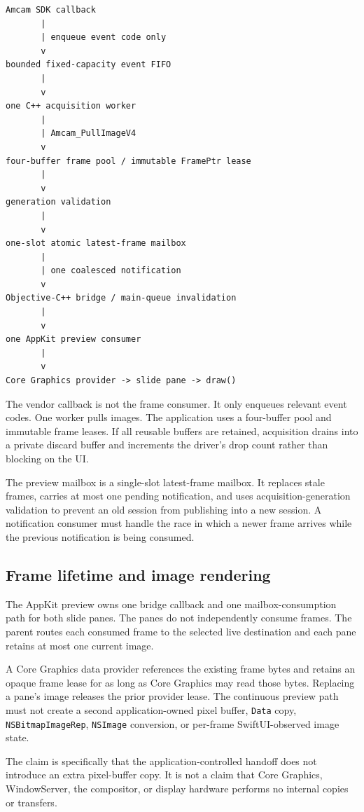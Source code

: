 \documentclass[11pt,a4paper,oneside]{article}
\newcommand{\code}[1]{\texttt{\small #1}}
\begin{document}
\begin{lstlisting}[basicstyle=\ttfamily\small,frame=single]
Amcam SDK callback
       |
       | enqueue event code only
       v
bounded fixed-capacity event FIFO
       |
       v
one C++ acquisition worker
       |
       | Amcam_PullImageV4
       v
four-buffer frame pool / immutable FramePtr lease
       |
       v
generation validation
       |
       v
one-slot atomic latest-frame mailbox
       |
       | one coalesced notification
       v
Objective-C++ bridge / main-queue invalidation
       |
       v
one AppKit preview consumer
       |
       v
Core Graphics provider -> slide pane -> draw()
\end{lstlisting}

The vendor callback is not the frame consumer. It only enqueues relevant event codes. One worker pulls images. The application uses a four-buffer pool and immutable frame leases. If all reusable buffers are retained, acquisition drains into a private discard buffer and increments the driver's drop count rather than blocking on the UI.

The preview mailbox is a single-slot latest-frame mailbox. It replaces stale frames, carries at most one pending notification, and uses acquisition-generation validation to prevent an old session from publishing into a new session. A notification consumer must handle the race in which a newer frame arrives while the previous notification is being consumed.

\subsection{Frame lifetime and image rendering}
The AppKit preview owns one bridge callback and one mailbox-consumption path for both slide panes. The panes do not independently consume frames. The parent routes each consumed frame to the selected live destination and each pane retains at most one current image.

A Core Graphics data provider references the existing frame bytes and retains an opaque frame lease for as long as Core Graphics may read those bytes. Replacing a pane's image releases the prior provider lease. The continuous preview path must not create a second application-owned pixel buffer, \code{Data} copy, \code{NSBitmapImageRep}, \code{NSImage} conversion, or per-frame SwiftUI-observed image state.

The claim is specifically that the application-controlled handoff does not introduce an extra pixel-buffer copy. It is not a claim that Core Graphics, WindowServer, the compositor, or display hardware performs no internal copies or transfers.
\end{document}
